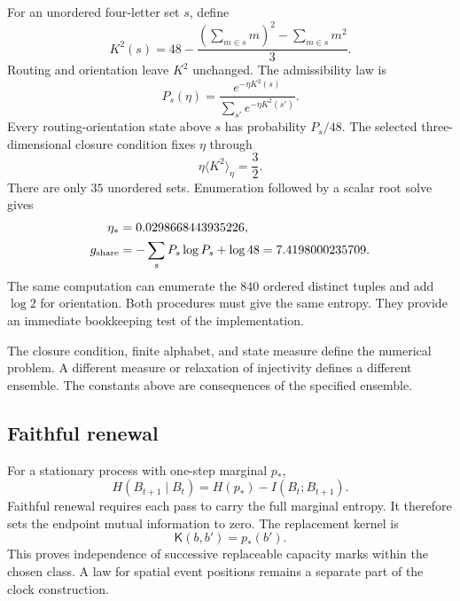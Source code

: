 For an unordered four-letter set $s$, define
\begin{equation}
K^2(s)=48-\frac{(\sum_{m\in s}m)^2-\sum_{m\in s}m^2}{3}.
\label{eq:K2}
\end{equation}
Routing and orientation leave $K^2$ unchanged. The admissibility law is
\begin{equation}
P_s(\eta)=\frac{e^{-\eta K^2(s)}}{\sum_{s'}e^{-\eta K^2(s')}}.
\end{equation}
Every routing-orientation state above $s$ has probability $P_s/48$. The selected three-dimensional closure condition fixes $\eta$ through
\begin{equation}
\eta\langle K^2\rangle_\eta=\frac32.
\label{eq:closure}
\end{equation}
There are only $35$ unordered sets. Enumeration followed by a scalar root solve gives
\begin{align}
\eta_*&=0.0298668443935226,\\
g_{\rm share}
&=-\sum_sP_s\log P_s+\log48
=7.4198000235709.
\label{eq:entropy}
\end{align}
The same computation can enumerate the $840$ ordered distinct tuples and add $\log2$ for orientation. Both procedures must give the same entropy. They provide an immediate bookkeeping test of the implementation.

The closure condition, finite alphabet, and state measure define the numerical problem. A different measure or relaxation of injectivity defines a different ensemble. The constants above are consequences of the specified ensemble.

\subsection{Faithful renewal}

For a stationary process with one-step marginal $p_*$,
\begin{equation}
H(B_{t+1}\mid B_t)=H(p_*)-I(B_t;B_{t+1}).
\end{equation}
Faithful renewal requires each pass to carry the full marginal entropy. It therefore sets the endpoint mutual information to zero. The replacement kernel is
\begin{equation}
\mathsf K(b,b')=p_*(b').
\label{eq:refresh}
\end{equation}
This proves independence of successive replaceable capacity marks within the chosen class. A law for spatial event positions remains a separate part of the clock construction.

